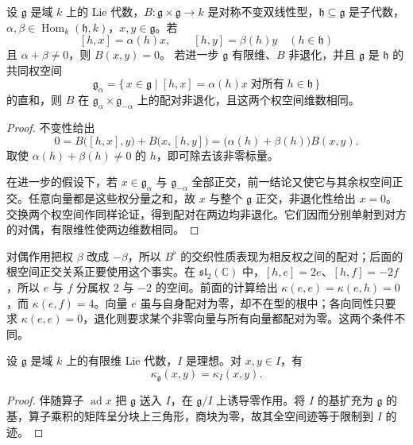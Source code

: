 \begin{proposition}\label{b5:prop:weight-orthogonality-invariant}
	设 \(\mathfrak g\) 是域 \(k\) 上的 Lie 代数，\(B:\mathfrak g\times\mathfrak g\to k\) 是对称不变双线性型，\(\mathfrak h\subseteq\mathfrak g\) 是子代数，\(\alpha,\beta\in\operatorname{Hom}_k(\mathfrak h,k)\)，\(x,y\in\mathfrak g\)。若
	\[
		[h,x]=\alpha(h)x,\qquad[h,y]=\beta(h)y \quad(h\in\mathfrak h)
	\]
	且 \(\alpha+\beta\ne0\)，则 \(B(x,y)=0\)。 若进一步 \(\mathfrak g\) 有限维、\(B\) 非退化，并且 \(\mathfrak g\) 是 \(\mathfrak h\) 的共同权空间
	\[
		\mathfrak g_\alpha= \{\,x\in\mathfrak g\mid[h,x]=\alpha(h)x\;\text{对所有}\;h\in\mathfrak h\,\}
	\]
	的直和，则 \(B\) 在 \(\mathfrak g_\alpha\times\mathfrak g_{-\alpha}\) 上的配对非退化，且这两个权空间维数相同。
\end{proposition}
\begin{proof}
	不变性给出
	\[
		0=B\bigl([h,x],y\bigr)+B\bigl(x,[h,y]\bigr) =\bigl(\alpha(h)+\beta(h)\bigr)B(x,y).
	\]
	取使 \(\alpha(h)+\beta(h)\ne0\) 的 \(h\)，即可除去该非零标量。

	在进一步的假设下，若 \(x\in\mathfrak g_\alpha\) 与 \(\mathfrak g_{-\alpha}\) 全部正交，前一结论又使它与其余权空间正交。任意向量都是这些权分量之和，故 \(x\) 与整个 \(\mathfrak g\) 正交，非退化性给出 \(x=0\)。交换两个权空间作同样论证，得到配对在两边均非退化。它们因而分别单射到对方的对偶，有限维性使两边维数相同。
\end{proof}

对偶作用把权 \(\beta\) 改成 \(-\beta\)，所以 \(B^\flat\) 的交织性质表现为相反权之间的配对；后面的根空间正交关系正要使用这个事实。在 \(\mathfrak{sl}_2(\mathbb C)\) 中，\([h,e]=2e\)、\([h,f]=-2f\)，所以 \(e\) 与 \(f\) 分属权 \(2\) 与 \(-2\) 的空间。前面的计算给出 \(\kappa(e,e)=\kappa(e,h)=0\)，而 \(\kappa(e,f)=4\)。向量 \(e\) 虽与自身配对为零，却不在型的根中；各向同性只要求 \(\kappa(e,e)=0\)，退化则要求某个非零向量与所有向量都配对为零。这两个条件不同。

\begin{lemma}\label{b5:lem:killing-restriction-ideal}
	设 \(\mathfrak g\) 是域 \(k\) 上的有限维 Lie 代数，\(I\) 是理想。对 \(x,y\in I\)，有
	\[
		\kappa_{\mathfrak g}(x,y)=\kappa_I(x,y).
	\]
\end{lemma}
\begin{proof}
	伴随算子 \(\operatorname{ad}x\) 把 \(\mathfrak g\) 送入 \(I\)，在 \(\mathfrak g/I\) 上诱导零作用。将 \(I\) 的基扩充为 \(\mathfrak g\) 的基，算子乘积的矩阵呈分块上三角形，商块为零，故其全空间迹等于限制到 \(I\) 的迹。
\end{proof}

